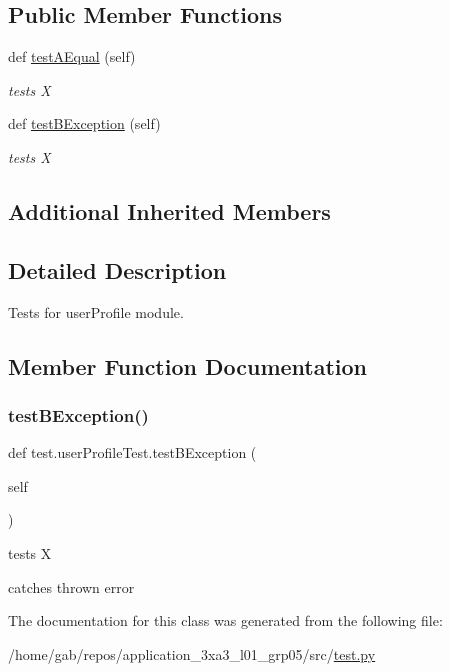 \subsection*{Public Member Functions}
\begin{DoxyCompactItemize}
\item 
\mbox{\label{classtest_1_1userProfileTest_a7c8e7b76a66aa454e25ac013af9d2197}} 
def \hyperlink{classtest_1_1userProfileTest_a7c8e7b76a66aa454e25ac013af9d2197}{test\+A\+Equal} (self)
\begin{DoxyCompactList}\small\item\em tests X \end{DoxyCompactList}\item 
def \hyperlink{classtest_1_1userProfileTest_a0c63611780a9c06e519e95e82d4794ce}{test\+B\+Exception} (self)
\begin{DoxyCompactList}\small\item\em tests X \end{DoxyCompactList}\end{DoxyCompactItemize}
\subsection*{Additional Inherited Members}


\subsection{Detailed Description}
Tests for user\+Profile module. 

\subsection{Member Function Documentation}
\mbox{\label{classtest_1_1userProfileTest_a0c63611780a9c06e519e95e82d4794ce}} 
\subsubsection{\texorpdfstring{test\+B\+Exception()}{testBException()}}
{\footnotesize\ttfamily def test.\+user\+Profile\+Test.\+test\+B\+Exception (\begin{DoxyParamCaption}\item[{}]{self }\end{DoxyParamCaption})}



tests X 

catches thrown error 

The documentation for this class was generated from the following file\+:\begin{DoxyCompactItemize}
\item 
/home/gab/repos/application\+\_\+3xa3\+\_\+l01\+\_\+grp05/src/\hyperlink{test_8py}{test.\+py}\end{DoxyCompactItemize}
